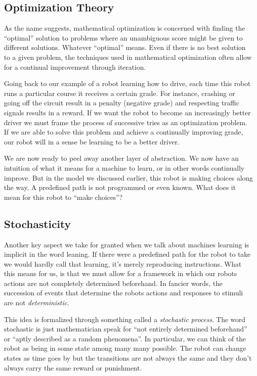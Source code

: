 \subsection{Optimization Theory}
As the name suggests, mathematical optimization is concerned 
with finding the ``optimal'' solution to problems where an 
unambiguous score might be given to different solutions.  
Whatever ``optimal'' means. Even if there is no best solution to 
a given problem, the techniques used in mathematical 
optimization often allow for a continual improvement through 
iteration.

Going back to our example of a robot learning how to drive, each 
time this robot runs a particular course it receives a certain 
grade. For instance, crashing or going off the circuit result in 
a penalty (negative grade) and respecting traffic signals 
results in a reward.  If we want the robot to become an 
increasingly better driver we must frame the process of 
successive tries as an optimization problem. If we are able to 
solve this problem and achieve a continually improving grade, 
our robot will in a sense be learning to be a better driver.

We are now ready to peel away another layer of abstraction.  We 
now have an intuition of what it means for a machine to learn, 
or in other words continually improve. But in the model we 
discussed earlier, this robot is making choices along the way. A 
predefined path is not programmed or even known. What does it 
mean for this robot to ``make choices''?

\subsection{Stochasticity}
Another key aspect we take for granted when we talk about 
machines learning is implicit in the word leaning. If there were 
a predefined path for the robot to take we would hardly call 
that learning, it's merely reproducing instructions.  What this 
means for us, is that we must allow for a framework in which our 
robots actions are not completely determined beforehand. In 
fancier words, the succession of events that determine the 
robots actions and responses to stimuli are not 
\textit{deterministic}.

This idea is formalized through something called a 
\textit{stochastic process}. The word stochastic is just 
mathematician speak for ``not entirely determined beforehand'' 
or ``aptly described as a random phenomena''.  In particular, we 
can think of the robot as being in some state among many many 
possible. The robot can change states as time goes by but the 
transitions are not always the same and they don't always carry 
the same reward or punishment.

